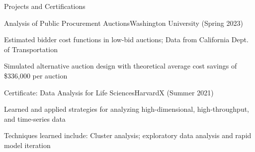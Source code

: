   \begin{rSection}{Projects and Certifications}
    \begin{rSubsection}{Analysis of Public Procurement Auctions}{Washington University (Spring 2023)}{}{}
    \item Estimated bidder cost functions in low-bid auctions; Data from California Dept. of Transportation
    \item Simulated alternative auction design with theoretical average cost savings of \$336,000 per auction
    \end{rSubsection}
    \begin{rSubsection}{Certificate: Data Analysis for Life Sciences}{HarvardX (Summer 2021)}{}{} 
    \item Learned and applied strategies for analyzing high-dimensional, high-throughput, and time-series data
    \item Techniques learned include: Cluster analysis; exploratory data analysis and rapid model iteration
    \end{rSubsection}
  \end{rSection}
